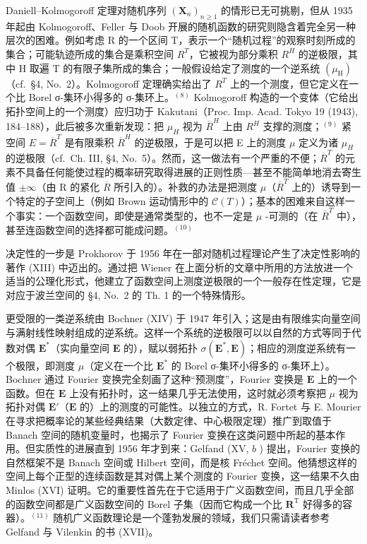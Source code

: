 Daniell--Kolmogoroff 定理对随机序列 \((\mathbf{X}_{n})_{n\geqslant1}\) 的情形已无可挑剔，但从 1935 年起由 Kolmogoroff、Feller 与 Doob 开展的随机函数的研究则隐含着完全另一种层次的困难。例如考虑 R 的一个区间 T，表示一个“随机过程”的观察时刻所成的集合；可能轨迹所成的集合是乘积空间 \(R^{T}\)，它被视为部分乘积 \(R^{H}\) 的逆极限，其中 H 取遍 T 的有限子集所成的集合；一般假设给定了测度的一个逆系统 \((\mu_{\mathrm{H}})\)（cf.~§4, No.~2）。Kolmogoroff 定理确实给出了 \(R^{T}\) 上的一个测度，但它定义在一个比 Borel σ-集环小得多的 σ-集环上。\(^{(8)}\) Kolmogoroff 构造的一个变体（它给出拓扑空间上的一个测度）应归功于 Kakutani（Proc. Imp. Acad. Tokyo 19 (1943), 184--188），此后被多次重新发现：把 \(\mu_{H}\) 视为 \(\overline{R}^{H}\) 上由 \(R^{H}\) 支撑的测度；\(^{(9)}\) 紧空间 \(E = \overline{R}^{T}\) 是有限乘积 \(\overline{R}^{H}\) 的逆极限，于是可以把 E 上的测度 \(\mu\) 定义为诸 \(\mu_{H}\) 的逆极限（cf.~Ch. III, §4, No.~5）。然而，这一做法有一个严重的不便；\(\overline{R}^{T}\) 的元素不具备任何能使过程的概率研究取得进展的正则性质---甚至不能简单地消去寄生值 \(\pm\infty\)（由 R 的紧化 \(\overline{R}\) 所引入的）。补救的办法是把测度 \(\mu\)（\(\overline{R}^{T}\) 上的）诱导到一个特定的子空间上（例如 Brown 运动情形中的 \(\mathcal{C}(T)\)）；基本的困难来自这样一个事实：一个函数空间，即使是通常类型的，也不一定是 \(\mu\) -可测的（在 \(\overline{R}^{T}\) 中），甚至连函数空间的选择都可能成问题。\(^{(10)}\)

决定性的一步是 Prokhorov 于 1956 年在一部对随机过程理论产生了决定性影响的著作 (XIII) 中迈出的。通过把 Wiener 在上面分析的文章中所用的方法放进一个适当的公理化形式，他建立了函数空间上测度逆极限的一个一般存在性定理，它是对应于波兰空间的 §4, No.~2 的 Th. 1 的一个特殊情形。

更受限的一类逆系统由 Bochner (XIV) 于 1947 年引入；这是由有限维实向量空间与满射线性映射组成的逆系统。这样一个系统的逆极限可以以自然的方式等同于代数对偶 \(\mathbf{E}^*\)（实向量空间 \(\mathbf{E}\) 的），赋以弱拓扑 \(\sigma (\mathbf{E}^{*},\mathbf{E})\)；相应的测度逆系统有一个极限，即测度 \(\mu\)（定义在一个比 \(\mathbf{E}^*\) 的 Borel σ-集环小得多的 σ-集环上）。Bochner 通过 Fourier 变换完全刻画了这种“预测度”，Fourier 变换是 \(\mathbf{E}\) 上的一个函数。但在 \(\mathbf{E}\) 上没有拓扑时，这一结果几乎无法使用，这时就必须考察把 \(\mu\) 视为拓扑对偶 \(\mathbf{E}'\)（\(\mathbf{E}\) 的）上的测度的可能性。以独立的方式，R. Fortet 与 E. Mourier 在寻求把概率论的某些经典结果（大数定律、中心极限定理）推广到取值于 Banach 空间的随机变量时，也揭示了 Fourier 变换在这类问题中所起的基本作用。但实质性的进展直到 1956 年才到来：Gelfand (XV, \(b\) ) 提出，Fourier 变换的自然框架不是 Banach 空间或 Hilbert 空间，而是核 Fréchet 空间。他猜想这样的空间上每个正型的连续函数是其对偶上某个测度的 Fourier 变换，这一结果不久由 Minlos (XVI) 证明。它的重要性首先在于它适用于广义函数空间，而且几乎全部的函数空间都是广义函数空间的 Borel 子集（因而它构成一个比 \(\mathbf{R}^{\mathrm{T}}\) 好得多的容器）。\(^{(11)}\) 随机广义函数理论是一个蓬勃发展的领域，我们只需请读者参考 Gelfand 与 Vilenkin 的书 (XVII)。

